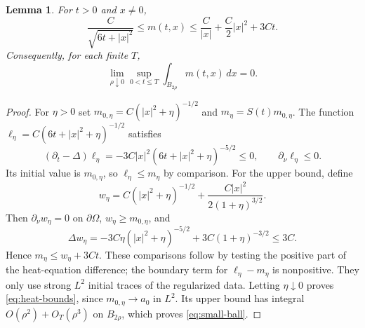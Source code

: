 \documentclass[11pt]{article}
\newtheorem{lemma}[theorem]{Lemma}
\theoremstyle{definition}
\newcommand{\Om}{\Omega}
\newcommand{\dd}{\,dx}
\begin{document}
\begin{lemma}\label{lem:heat}
For $t>0$ and $x\ne0$,
\begin{equation}\label{eq:heat-bounds}
 \frac C{\sqrt{6t+|x|^2}}\le m(t,x)
       \le\frac C{|x|}+\frac C2|x|^2+3Ct.
\end{equation}
Consequently, for each finite $T$,
\begin{equation}\label{eq:small-ball}
 \lim_{\rho\downarrow0}\sup_{0<t\le T}
          \int_{B_{2\rho}}m(t,x)\dd=0.
\end{equation}
\end{lemma}
\begin{proof}
For $\eta>0$ set $m_{0,\eta}=C(|x|^2+\eta)^{-1/2}$ and
$m_\eta=S(t)m_{0,\eta}$. The function
$\ell_\eta=C(6t+|x|^2+\eta)^{-1/2}$ satisfies
\[
 (\partial_t-\Delta)\ell_\eta
       =-3C|x|^2(6t+|x|^2+\eta)^{-5/2}\le0,
 \qquad\partial_\nu\ell_\eta\le0.
\]
Its initial value is $m_{0,\eta}$, so $\ell_\eta\le m_\eta$ by comparison.
For the upper bound, define
\[
 w_\eta=C(|x|^2+\eta)^{-1/2}
             +\frac{C|x|^2}{2(1+\eta)^{3/2}}.
\]
Then $\partial_\nu w_\eta=0$ on $\partial\Om$, $w_\eta\ge m_{0,\eta}$,
and
\[
 \Delta w_\eta=-3C\eta(|x|^2+\eta)^{-5/2}
                  +3C(1+\eta)^{-3/2}\le3C.
\]
Hence $m_\eta\le w_\eta+3Ct$. These comparisons follow by testing the
positive part of the heat-equation difference; the boundary term for
$\ell_\eta-m_\eta$ is nonpositive. They only use strong $L^2$ initial
traces of the regularized data. Letting $\eta\downarrow0$ proves
\eqref{eq:heat-bounds}, since $m_{0,\eta}\to a_0$ in $L^2$. Its upper
bound has integral $O(\rho^2)+O_T(\rho^3)$ on $B_{2\rho}$, which proves
\eqref{eq:small-ball}.
\end{proof}
\end{document}
